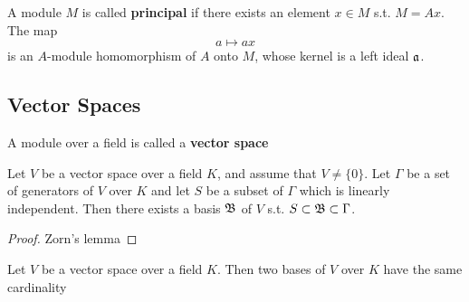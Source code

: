 \documentclass[11pt]{article}
\begin{document}
A module \(M\) is called \textbf{principal} if there exists an element \(x\in M\) s.t. \(M=Ax\). The map
 \begin{equation*}
a\mapsto ax
 \end{equation*}
is an \(A\)-module homomorphism of \(A\) onto \(M\), whose kernel is a left ideal \(\mathfrak{a}\).

\subsection{Vector Spaces}
\label{sec:org00afee4}
A module over a field is called a \textbf{vector space}

\begin{theorem}[]
Let \(V\) be a vector space over a field \(K\), and assume that \(V\neq\{0\}\). Let \(\Gamma\) be a set of
generators of \(V\) over \(K\) and let \(S\) be a subset of \(\Gamma\) which is linearly independent. Then
there exists a basis \(\mathfrak{B}\) of \(V\) s.t. \(S\subset\mathfrak{B}\subset\Gamma\).
\end{theorem}

\begin{proof}
Zorn's lemma
\end{proof}

\begin{theorem}[]
Let \(V\) be a vector space over a field \(K\). Then two bases of \(V\) over \(K\) have the same cardinality
\end{theorem}
\end{document}
